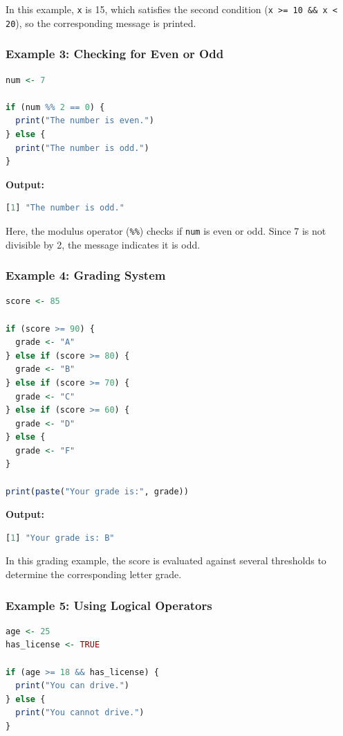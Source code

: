 \documentclass[10pt]{book}
\begin{document}
In this example, \texttt{x} is 15, which satisfies the second condition (\texttt{x >= 10 \&\& x < 20}), so the corresponding message is printed.

\subsubsection{Example 3: Checking for Even or Odd}

\begin{lstlisting}[language=R]
num <- 7

if (num %% 2 == 0) {
  print("The number is even.")
} else {
  print("The number is odd.")
}
\end{lstlisting}

\textbf{Output:}
\begin{lstlisting}[language=R]
[1] "The number is odd."
\end{lstlisting}

Here, the modulus operator (\texttt{\%\%}) checks if \texttt{num} is even or odd. Since 7 is not divisible by 2, the message indicates it is odd.

\subsubsection{Example 4: Grading System}

\begin{lstlisting}[language=R]
score <- 85

if (score >= 90) {
  grade <- "A"
} else if (score >= 80) {
  grade <- "B"
} else if (score >= 70) {
  grade <- "C"
} else if (score >= 60) {
  grade <- "D"
} else {
  grade <- "F"
}

print(paste("Your grade is:", grade))
\end{lstlisting}

\textbf{Output:}
\begin{lstlisting}[language=R]
[1] "Your grade is: B"
\end{lstlisting}

In this grading example, the score is evaluated against several thresholds to determine the corresponding letter grade.




\subsubsection{Example 5: Using Logical Operators}

\begin{lstlisting}[language=R]
age <- 25
has_license <- TRUE

if (age >= 18 && has_license) {
  print("You can drive.")
} else {
  print("You cannot drive.")
}
\end{lstlisting}
\end{document}
